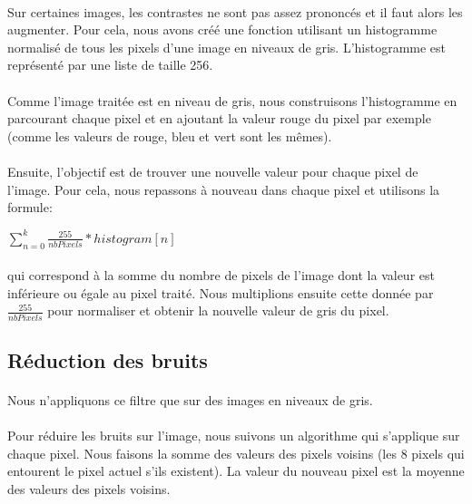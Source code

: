 \documentclass{article}
\begin{document}
\paragraph{}Sur certaines images, les contrastes ne sont pas assez prononcés et il faut alors les augmenter. Pour cela, nous avons créé une fonction utilisant un histogramme normalisé de tous les pixels d'une image en niveaux de gris. L'histogramme est représenté par une liste de taille 256.

\paragraph{}Comme l'image traitée est en niveau de gris, nous construisons l'histogramme en parcourant chaque pixel et en ajoutant la valeur rouge du pixel par exemple (comme les valeurs de rouge, bleu et vert sont les mêmes).

\paragraph{}Ensuite, l'objectif est de trouver une nouvelle valeur pour chaque pixel de l'image. Pour cela, nous repassons à nouveau dans chaque pixel et utilisons la formule:\newline
\begin{center}
	$\sum_{n=0}^{k}\frac{255}{nbPixels}*histogram[n]$
\end{center}

\paragraph{}qui correspond à la somme du nombre de pixels de l'image dont la valeur est inférieure ou égale au pixel traité. Nous multiplions ensuite cette donnée par $\frac{255}{nbPixels}$ pour normaliser et obtenir la nouvelle valeur de gris du pixel.


\subsection{Réduction des bruits}

\paragraph{}Nous n'appliquons ce filtre que sur des images en niveaux de gris.

\paragraph{}Pour réduire les bruits sur l'image, nous suivons un algorithme qui s'applique sur chaque pixel. Nous faisons la somme des valeurs des pixels voisins (les 8 pixels qui entourent le pixel actuel s'ils existent). La valeur du nouveau pixel est la moyenne des valeurs des pixels voisins.
\end{document}
